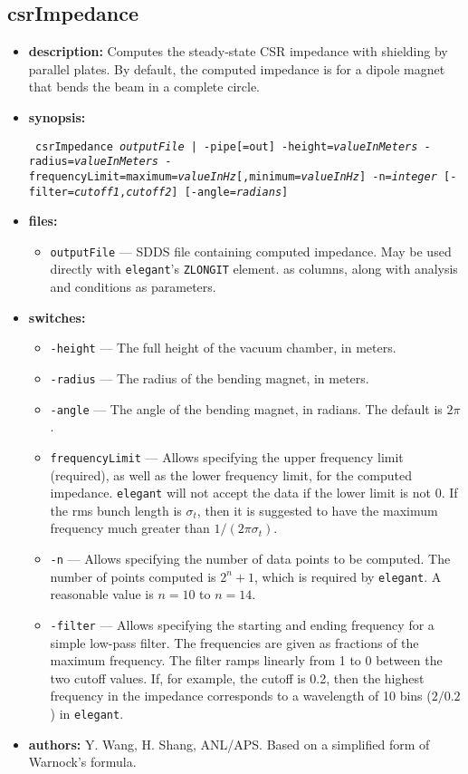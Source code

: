 \documentclass[11pt]{article}
\begin{document}
\subsection{csrImpedance}

\begin{itemize}
\item {\bf description:}  Computes the steady-state CSR impedance with shielding by parallel plates.
By default, the computed impedance is for a dipole magnet that bends the beam in a complete circle.

\item {\bf synopsis:}
\begin{flushleft}{\tt
csrImpedance {{\em outputFile}  | -pipe[=out]} -height={\em valueInMeters} -radius={\em valueInMeters}
-frequencyLimit=maximum={\em valueInHz}[,minimum={\em valueInHz}] -n={\em integer} [-filter={\em cutoff1},{\em cutoff2}]
[-angle={\em radians}]
}\end{flushleft}

\item {\bf files:}
\begin{itemize}
\item {\tt outputFile} --- SDDS file containing computed impedance.  May be used directly with 
{\tt elegant}'s \verb|ZLONGIT| element.
 as columns, along with analysis and conditions as parameters.
\end{itemize}

\item {\bf switches:}
\begin{itemize}
\item {\tt -height} --- The full height of the vacuum chamber, in meters.
\item {\tt -radius} --- The radius of the bending magnet, in meters.
\item {\tt -angle} --- The angle of the bending magnet, in radians.  The default is $2\pi$.
\item {\tt frequencyLimit} --- Allows specifying the upper frequency limit (required), as well as the
 lower frequency limit, for the computed impedance.  {\tt elegant} will not accept the data if the lower
 limit is not 0.  If the rms bunch length is $\sigma_t$, then it is suggested to have the maximum frequency 
 much greater than $1/(2\pi\sigma_t)$.
\item {\tt -n} --- Allows specifying the number of data points to be computed. The number of points computed
 is $2^n+1$, which is required by {\tt elegant}.  A reasonable value is $n=10$ to $n=14$.
\item {\tt -filter} --- Allows specifying the starting and ending frequency for a simple low-pass filter.
 The frequencies are given as fractions of the maximum frequency.  The filter ramps linearly from 1 to 0
 between the two cutoff values.  If, for example, the cutoff is 0.2, then the highest frequency
 in the impedance corresponds to a wavelength of 10 bins ($2/0.2$) in {\tt elegant}.
\end{itemize}

\item {\bf authors:} Y. Wang, H. Shang, ANL/APS.
Based on a simplified form\cite{Agoh} of Warnock's \cite{Warnock} formula.
\end{itemize}
\end{document}

